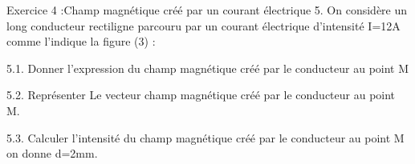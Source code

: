 \documentclass[12pt, french]{article}
\begin{document}
\begin{Box2}{Exercice 4 :Champ magnétique créé par un courant électrique  }
   5. On considère un long conducteur rectiligne parcouru par un courant électrique d'intensité I=12A comme l'indique la
figure (3) :

5.1. Donner l'expression du champ magnétique créé par le conducteur au point M

5.2. Représenter Le vecteur champ magnétique créé par le conducteur au point M.

5.3. Calculer l'intensité du champ magnétique créé par le conducteur au point M on donne d=2mm.

\end{Box2}

  


\end{document}
